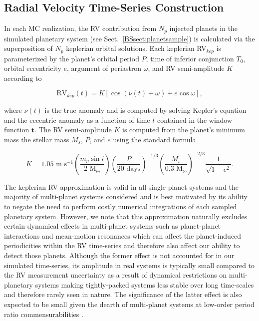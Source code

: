 \subsection{Radial Velocity Time-Series Construction} \label{BSsect:timeseries}
In each MC realization, 
the RV contribution from $N_p$ injected planets in the simulated planetary system (see Sect.~\ref{BSsect:planetsample})
is calculated via the superposition of $N_p$ keplerian orbital solutions. Each keplerian RV$_{kep}$ is parameterized by
the planet's orbital period $P$, time of inferior conjunction $T_0$, orbital eccentricity $e$,
argument of periastron $\omega$, and RV semi-amplitude $K$ according to

\begin{equation}
 \text{RV}_{kep}(t) = K [\cos{(\nu(t) +\omega)} + e \cos{\omega}],
\end{equation}

\noindent where $\nu(t)$ is the true anomaly and is computed by solving Kepler's equation
and the eccentric anomaly as a function of time $t$ contained in the window function
$\mathbf{t}$. The RV semi-amplitude $K$ is computed from the planet's minimum mass
\msini{,} the stellar mass $M_s$, $P$, and $e$ using the standard formula

\begin{equation}
  K = 1.05 \text{ m s}^{-1} \left(\frac{m_p\sin{i}}{2\text{ M}_{\oplus}} \right)
  \left( \frac{P}{20 \text{ days}} \right)^{-1/3} 
  \left( \frac{M_s}{0.3 \text{ M}_{\odot}} \right)^{-2/3}
  \frac{1}{\sqrt{1-e^2}}.
\end{equation}

The keplerian RV approximation
is valid in all single-planet systems and the majority of multi-planet systems considered
and is best motivated by its ability to negate the
need to perform costly numerical integrations of each sampled planetary system. However, we note that
this approximation naturally excludes certain dynamical effects in multi-planet systems such as planet-planet
interactions and mean-motion resonances which can affect the planet-induced periodicities within
the RV time-series and therefore also affect our ability to detect those planets.
Although the former effect is not accounted for in our simulated time-series, its amplitude in real
systems is typically small compared to the RV measurement uncertainty as a result of dynamical restrictions
on multi-planetary systems making tightly-packed systems less stable over long time-scales and therefore
rarely seen in nature.
The significance of the latter effect is also expected to be small given the dearth of 
multi-planet systems at low-order period ratio commensurabilities \citep{lissauer11, fabrycky14}. \\

